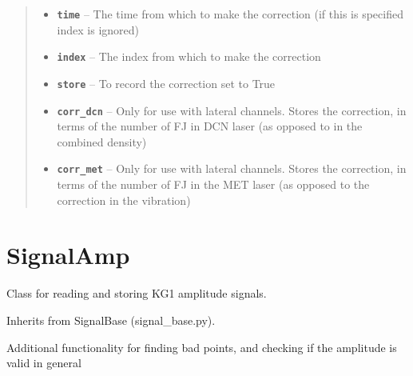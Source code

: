 \documentclass[letterpaper,10pt,english]{sphinxmanual}
\begin{document}
\begin{fulllineitems}
\begin{fulllineitems}
\begin{quote}
\begin{description}
\begin{itemize}
\item {} 
\textbf{\texttt{time}} -- The time from which to make the correction (if this is specified index is ignored)

\item {} 
\textbf{\texttt{index}} -- The index from which to make the correction

\item {} 
\textbf{\texttt{store}} -- To record the correction set to True

\item {} 
\textbf{\texttt{corr\_dcn}} -- Only for use with lateral channels. Stores the correction,
in terms of the number of FJ in DCN laser (as opposed to in the combined density)

\item {} 
\textbf{\texttt{corr\_met}} -- Only for use with lateral channels. Stores the correction,
in terms of the number of FJ in the MET laser (as opposed to the correction in the vibration)

\end{itemize}

\end{description}\end{quote}

\end{fulllineitems}


\end{fulllineitems}



\section{SignalAmp}
\label{signal_amp:signalamp}\label{signal_amp:module-signal_amp}\label{signal_amp::doc}
Class for reading and storing KG1 amplitude signals.

Inherits from SignalBase (signal\_base.py).

Additional functionality for finding bad points,
and checking if the amplitude is valid in general
\end{document}
